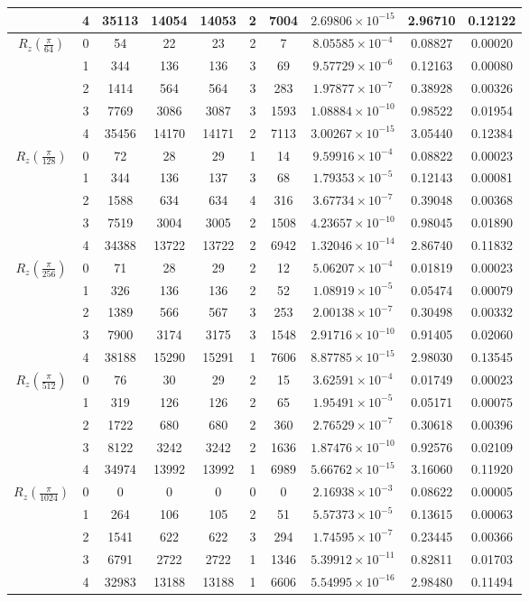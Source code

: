 \documentclass[english,journal]{extarticle}
\providecommand{\tabularnewline}{\\}
\theoremstyle{plain}
\theoremstyle{plain}
\theoremstyle{plain}
\theoremstyle{definition}
\theoremstyle{plain}
\theoremstyle{plain}
\begin{document}
\begin{table}
{\begin{tabular}{|c||c||c|c|c|c|c||c||c|c|}
& 4 & 35113 & 14054 & 14053 & 2 & 7004 & $2.69806\times 10^{-15}$ & 2.96710 & 0.12122\tabularnewline \cline{2-10}
\hline 
\hline 
\multirow{5}{*}{$R_{z}\left(\frac{\pi}{64}\right)$} 
& 0 & 54 & 22 & 23 & 2 & 7 & $8.05585\times 10^{-4}$ & 0.08827 & 0.00020\tabularnewline \cline{2-10}
& 1 & 344 & 136 & 136 & 3 & 69 & $9.57729\times 10^{-6}$ & 0.12163 & 0.00080\tabularnewline \cline{2-10}
& 2 & 1414 & 564 & 564 & 3 & 283 & $1.97877\times 10^{-7}$ & 0.38928 & 0.00326\tabularnewline \cline{2-10}
& 3 & 7769 & 3086 & 3087 & 3 & 1593 & $1.08884\times 10^{-10}$ & 0.98522 & 0.01954\tabularnewline \cline{2-10}
& 4 & 35456 & 14170 & 14171 & 2 & 7113 & $3.00267\times 10^{-15}$ & 3.05440 & 0.12384\tabularnewline \cline{2-10}
\hline 
\hline 
\multirow{5}{*}{$R_{z}\left(\frac{\pi}{128}\right)$} 
& 0 & 72 & 28 & 29 & 1 & 14 & $9.59916\times 10^{-4}$ & 0.08822 & 0.00023\tabularnewline \cline{2-10}
& 1 & 344 & 136 & 137 & 3 & 68 & $1.79353\times 10^{-5}$ & 0.12143 & 0.00081\tabularnewline \cline{2-10}
& 2 & 1588 & 634 & 634 & 4 & 316 & $3.67734\times 10^{-7}$ & 0.39048 & 0.00368\tabularnewline \cline{2-10}
& 3 & 7519 & 3004 & 3005 & 2 & 1508 & $4.23657\times 10^{-10}$ & 0.98045 & 0.01890\tabularnewline \cline{2-10}
& 4 & 34388 & 13722 & 13722 & 2 & 6942 & $1.32046\times 10^{-14}$ & 2.86740 & 0.11832\tabularnewline \cline{2-10}
\hline 
\hline 
\multirow{5}{*}{$R_{z}\left(\frac{\pi}{256}\right)$} 
& 0 & 71 & 28 & 29 & 2 & 12 & $5.06207\times 10^{-4}$ & 0.01819 & 0.00023\tabularnewline \cline{2-10}
& 1 & 326 & 136 & 136 & 2 & 52 & $1.08919\times 10^{-5}$ & 0.05474 & 0.00079\tabularnewline \cline{2-10}
& 2 & 1389 & 566 & 567 & 3 & 253 & $2.00138\times 10^{-7}$ & 0.30498 & 0.00332\tabularnewline \cline{2-10}
& 3 & 7900 & 3174 & 3175 & 3 & 1548 & $2.91716\times 10^{-10}$ & 0.91405 & 0.02060\tabularnewline \cline{2-10}
& 4 & 38188 & 15290 & 15291 & 1 & 7606 & $8.87785\times 10^{-15}$ & 2.98030 & 0.13545\tabularnewline \cline{2-10}
\hline 
\hline 
\multirow{5}{*}{$R_{z}\left(\frac{\pi}{512}\right)$} 
& 0 & 76 & 30 & 29 & 2 & 15 & $3.62591\times 10^{-4}$ & 0.01749 & 0.00023\tabularnewline \cline{2-10}
& 1 & 319 & 126 & 126 & 2 & 65 & $1.95491\times 10^{-5}$ & 0.05171 & 0.00075\tabularnewline \cline{2-10}
& 2 & 1722 & 680 & 680 & 2 & 360 & $2.76529\times 10^{-7}$ & 0.30618 & 0.00396\tabularnewline \cline{2-10}
& 3 & 8122 & 3242 & 3242 & 2 & 1636 & $1.87476\times 10^{-10}$ & 0.92576 & 0.02109\tabularnewline \cline{2-10}
& 4 & 34974 & 13992 & 13992 & 1 & 6989 & $5.66762\times 10^{-15}$ & 3.16060 & 0.11920\tabularnewline \cline{2-10}
\hline 
\hline 
\multirow{5}{*}{$R_{z}\left(\frac{\pi}{1024}\right)$} 
& 0 & 0 & 0 & 0 & 0 & 0 & $2.16938\times 10^{-3}$ & 0.08622 & 0.00005\tabularnewline \cline{2-10}
& 1 & 264 & 106 & 105 & 2 & 51 & $5.57373\times 10^{-5}$ & 0.13615 & 0.00063\tabularnewline \cline{2-10}
& 2 & 1541 & 622 & 622 & 3 & 294 & $1.74595\times 10^{-7}$ & 0.23445 & 0.00366\tabularnewline \cline{2-10}
& 3 & 6791 & 2722 & 2722 & 1 & 1346 & $5.39912\times 10^{-11}$ & 0.82811 & 0.01703\tabularnewline \cline{2-10}
& 4 & 32983 & 13188 & 13188 & 1 & 6606 & $5.54995\times 10^{-16}$ & 2.98480 & 0.11494\tabularnewline \cline{2-10}
\hline 
\end{tabular}}
\end{table}
\end{document}
